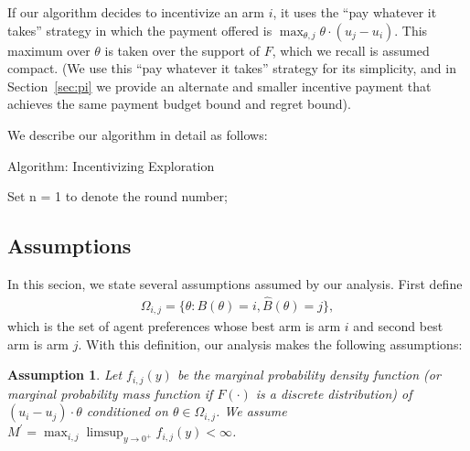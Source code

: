 \documentclass{article}
\newtheorem{assumption}{Assumption}
\begin{document}
If our algorithm decides to incentivize an arm $i$, it uses the ``pay whatever it takes'' strategy in which the payment offered is $\max_{\theta,j} \theta \cdot (u_j - u_i)$. This maximum over $\theta$ is taken over the support of $F$, which we recall is assumed compact.  (We use this ``pay whatever it takes'' strategy for its simplicity, and in Section~\ref{sec:pi} we provide an alternate and smaller incentive payment that achieves the same payment budget bound and regret bound). 

We describe our algorithm in detail as follows:

\begin{algorithm}
\caption{Algorithm: Incentivizing Exploration}
\label{Alg1}
\begin{algorithmic}
\STATE Set n = 1 to denote the round number;
\ENDFOR

\end{algorithmic}
\end{algorithm}


\subsection{Assumptions}
In this secion, we state several assumptions assumed by our analysis.  First define
\begin{align}
\Omega_{i,j}=\{\theta:B(\theta)=i, \hat{B}(\theta)=j\}, \nonumber 
\end{align}
which is the set of agent preferences whose best arm is arm $i$ and second best arm is arm $j$. With this definition, our analysis makes the following assumptions:

\begin{assumption} Let $f_{i,j}(y)$ be the marginal probability density function (or marginal probability mass function if $F(\cdot)$ is a discrete distribution) of $(u_i-u_j)\cdot\theta$ conditioned on $\theta \in \Omega_{i,j}$. We assume $M^{'}=\max_{i,j}\limsup_{y\rightarrow 0^{+}}f_{i,j}(y) <\infty$.
\label{A1}
\end{assumption}
\end{document}
